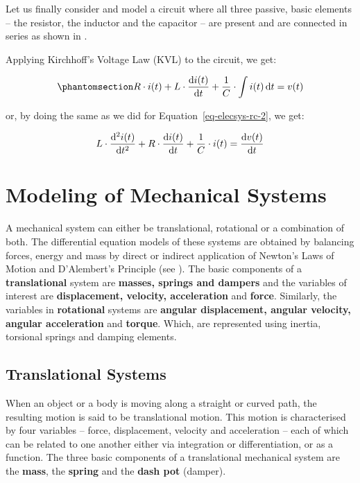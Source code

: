 \documentclass[
  14pt,
  a4paper,
  oneside,
  open=any,
  a4paper,
  14pt]{report}
\begin{document}
Let us finally consider and model a circuit where all three passive,
basic elements -- the resistor, the inductor and the capacitor -- are
present and are connected in series as shown in .

Applying Kirchhoff's Voltage Law (KVL) to the circuit, we get:

\begin{equation}\phantomsection\label{eq-elecsys-rlc-1}{
    R\cdot i(t) + L \cdot \odv{i(t)}{t} + \dfrac{1}{C} \cdot \int i(t) \odif{t} = v(t)
}\end{equation}

or, by doing the same as we did for Equation~\ref{eq-elecsys-rc-2}, we
get:

\[
    L\cdot \odv[2]{i(t)}{t} + R \cdot \odv{i(t)}{t} + \dfrac{1}{C} \cdot i(t) = \odv{v(t)}{t}
\]

\section{Modeling of Mechanical
Systems}\label{modeling-of-mechanical-systems}

A mechanical system can either be translational, rotational or a
combination of both. The differential equation models of these systems
are obtained by balancing forces, energy and mass by direct or indirect
application of Newton's Laws of Motion and D'Alembert's Principle (see
). The basic components of a \textbf{translational} system are
\textbf{masses, springs and dampers} and the variables of interest are
\textbf{displacement, velocity, acceleration} and \textbf{force}.
Similarly, the variables in \textbf{rotational} systems are
\textbf{angular displacement, angular velocity, angular acceleration}
and \textbf{torque}. Which, are represented using inertia, torsional
springs and damping elements.

\subsection{Translational Systems}\label{translational-systems}

When an object or a body is moving along a straight or curved path, the
resulting motion is said to be translational motion. This motion is
characterised by four variables -- force, displacement, velocity and
acceleration -- each of which can be related to one another either via
integration or differentiation, or as a function. The three basic
components of a translational mechanical system are the \textbf{mass},
the \textbf{spring} and the \textbf{dash pot} (damper).
\end{document}
